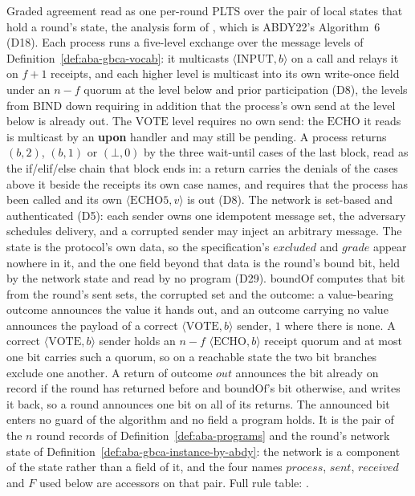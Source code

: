 \begin{definition}
  \label{def:aba-gbca-impl}
  \leanok
  Graded agreement read as one per-round PLTS over the pair of local states that hold a round's state, the analysis form of , which is ABDY22's Algorithm~6 (D18).
  Each process runs a five-level exchange over the message levels of Definition~\ref{def:aba-gbca-vocab}: it multicasts $\langle\mathrm{INPUT},b\rangle$ on a call and relays it on $f{+}1$ receipts, and each higher level is multicast into its own write-once field under an $n{-}f$ quorum at the level below and prior participation (D8), the levels from $\mathrm{BIND}$ down requiring in addition that the process's own send at the level below is already out.
  The $\mathrm{VOTE}$ level requires no own send: the $\mathrm{ECHO}$ it reads is multicast by an \textbf{upon} handler and may still be pending.
  A process returns $(b,2)$, $(b,1)$ or $(\bot,0)$ by the three wait-until cases of the last block, read as the if/elif/else chain that block ends in: a return carries the denials of the cases above it beside the receipts its own case names, and requires that the process has been called and its own $\langle\mathrm{ECHO5},v\rangle$ is out (D8).
  The network is set-based and authenticated (D5): each sender owns one idempotent message set, the adversary schedules delivery, and a corrupted sender may inject an arbitrary message.
  The state is the protocol's own data, so the specification's $excluded$ and $grade$ appear nowhere in it, and the one field beyond that data is the round's bound bit, held by the network state and read by no program (D29).
  $\mathrm{boundOf}$ computes that bit from the round's sent sets, the corrupted set and the outcome: a value-bearing outcome announces the value it hands out, and an outcome carrying no value announces the payload of a correct $\langle\mathrm{VOTE}, b\rangle$ sender, $1$ where there is none.
  A correct $\langle\mathrm{VOTE}, b\rangle$ sender holds an $n{-}f$ $\langle\mathrm{ECHO}, b\rangle$ receipt quorum and at most one bit carries such a quorum, so on a reachable state the two bit branches exclude one another.
  A return of outcome $out$ announces the bit already on record if the round has returned before and $\mathrm{boundOf}$'s bit otherwise, and writes it back, so a round announces one bit on all of its returns.
  The announced bit enters no guard of the algorithm and no field a program holds.
  It is the pair of the $n$ round records of Definition~\ref{def:aba-programs} and the round's network state of Definition~\ref{def:aba-gbca-instance-by-abdy}: the network is a component of the state rather than a field of it, and the four names $process$, $sent$, $received$ and $F$ used below are accessors on that pair.
  Full rule table: .
\end{definition}
